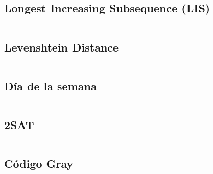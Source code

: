 \documentclass[11pt]{article}
\begin{document}
		\subsection{Longest Increasing Subsequence (LIS)}
		\inputminted[tabsize=2,breaklines,firstline=5,lastline=19,fontsize=\small]{c++}{misc.cpp}
		
		\subsection{Levenshtein Distance}
		\inputminted[tabsize=2,breaklines,firstline=145,lastline=156,fontsize=\small]{c++}{misc.cpp}
		
		\subsection{Día de la semana}
		\inputminted[tabsize=2,breaklines,firstline=35,lastline=44,fontsize=\small]{c++}{misc.cpp}
		
		\subsection{2SAT}
		\inputminted[tabsize=2,breaklines,firstline=85,lastline=128,fontsize=\small]{c++}{misc.cpp}
		
		\subsection{Código Gray}
		\inputminted[tabsize=2,breaklines,firstline=130,lastline=143,fontsize=\small]{c++}{misc.cpp}
\end{document}
